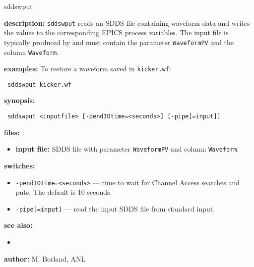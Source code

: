 \begin{sddsprog}{sddswput}
\item \textbf{description:}
  \verb+sddswput+ reads an SDDS file containing waveform data and writes the
  values to the corresponding EPICS process variables.  The input file is
  typically produced by  and must contain the parameter
  \verb|WaveformPV| and the column \verb|Waveform|.

\item \textbf{examples:}
  To restore a waveform saved in \verb|kicker.wf|:
  \begin{flushleft}{\tt
  sddswput kicker.wf
  }\end{flushleft}

\item \textbf{synopsis:}
  \begin{flushleft}{\tt
  sddswput <inputfile>\
      [-pendIOtime=<seconds>] [-pipe[=input]]
  }\end{flushleft}

\item \textbf{files:}
  \begin{itemize}
  \item \textbf{input file:} SDDS file with parameter \verb|WaveformPV| and column \verb|Waveform|.
  \end{itemize}

\item \textbf{switches:}
  \begin{itemize}
  \item {\tt -pendIOtime=<seconds>} --- time to wait for Channel Access searches and puts. The default is 10 seconds.
  \item {\tt -pipe[=input]} --- read the input SDDS file from standard input.
  \end{itemize}

\item \textbf{see also:}
  \begin{itemize}
  \item {}
  \end{itemize}

\item \textbf{author:} M. Borland, ANL
\end{sddsprog}
